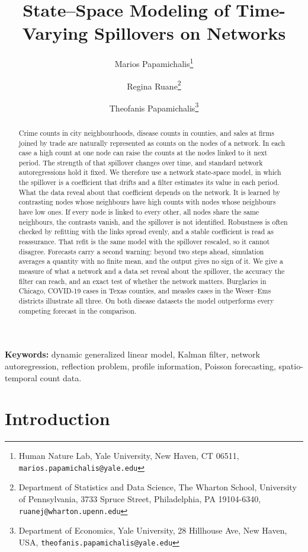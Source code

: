 \documentclass[12pt]{article}
\title{State--Space Modeling of Time-Varying Spillovers on Networks}
\author{
  Marios Papamichalis\thanks{Human Nature Lab, Yale University, New Haven, CT 06511, \texttt{marios.papamichalis@yale.edu}} \and
  Regina Ruane\thanks{Department of Statistics and Data Science, The Wharton School, University of Pennsylvania, 3733 Spruce Street, Philadelphia, PA 19104-6340, \texttt{ruanej@wharton.upenn.edu}} \and Theofanis Papamichalis\thanks{Department of Economics, Yale University, 28 Hillhouse Ave, New Haven, USA, \texttt{theofanis.papamichalis@yale.edu}}
}
\date{}
\theoremstyle{plain}
\theoremstyle{definition}
\theoremstyle{remark}
\begin{document}
\maketitle

\begin{abstract}
Crime counts in city neighbourhoods, disease counts in counties, and sales at firms joined by trade are naturally represented as counts on the nodes of a network. In each case a high count at one node can raise the counts at the nodes linked to it next period. The strength of that spillover changes over time, and standard network autoregressions hold it fixed. We therefore use a network state-space model, in which the spillover is a coefficient that drifts and a filter estimates its value in each period. What the data reveal about that coefficient depends on the network. It is learned by contrasting nodes whose neighbours have high counts with nodes whose neighbours have low ones. If every node is linked to every other, all nodes share the same neighbours, the contrasts vanish, and the spillover is not identified. Robustness is often checked by refitting with the links spread evenly, and a stable coefficient is read as reassurance. That refit is the same model with the spillover rescaled, so it cannot disagree. Forecasts carry a second warning: beyond two steps ahead, simulation averages a quantity with no finite mean, and the output gives no sign of it. We give a measure of what a network and a data set reveal about the spillover, the accuracy the filter can reach, and an exact test of whether the network matters. Burglaries in Chicago, COVID-19 cases in Texas counties, and measles cases in the Weser--Ems districts illustrate all three. On both disease datasets the model outperforms every competing forecast in the comparison.
\end{abstract}

\noindent\textbf{Keywords:} dynamic generalized linear model, Kalman filter, network autoregression, reflection problem, profile information, Poisson forecasting, spatio-temporal count data.

\section{Introduction}\label{sec:intro}
\end{document}
